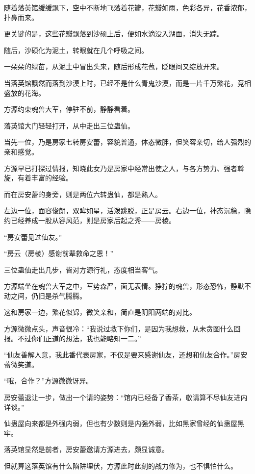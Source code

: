 
\begin{this_body}

随着落英馆缓缓飘下，空中不断地飞落着花瓣，花瓣如雨，色彩各异，花香浓郁，扑鼻而来。

更关键的是，这些花瓣飘落到沙硕上后，便如水滴没入湖面，消失无踪。

随后，沙硕化为泥土，转眼就在几个呼吸之间。

一朵朵的绿苗，从泥土中冒出头来，随后形成花苞，眨眼间又绽放开来。

当落英馆飘然而落到沙漠上时，已经不是什么青鬼沙漠，而是一片千万繁花，竞相盛放的花海。

方源约束魂兽大军，停驻不前，静静看着。

落英馆大门轻轻打开，从中走出三位蛊仙。

当先一位，乃是房家七转房安蕾，容貌普通，体态微胖，但笑容亲切，给人强烈的亲和感觉。

方源早已打探过情报，知晓此女乃是房家中经常出使之人，与各方势力、强者斡旋，有着丰富的经验。

而在房安蕾的身旁，则是两位六转蛊仙，都是熟人。

左边一位，面容俊朗，双眸如星，活泼跳脱，正是房云。右边一位，神态沉稳，隐约已经养成一股从容风范，则是房家后起之秀——房棱。

“房安蕾见过仙友。”

“房云（房棱）感谢前辈救命之恩！”

三位蛊仙走出几步，皆对方源行礼，态度相当客气。

方源端坐在魂兽大军之中，军势森严，面无表情。狰狞的魂兽，形态恐怖，静默不动之间，仍旧是杀气腾腾。

这和房家一边，繁花似锦，微笑亲和，简直是阴阳两端的对比。

方源微微点头，声音很冷：“我说过救下你们，是因为我想救，从未贪图什么回报。不过你们正道的想法，我也能略知一二。”

“仙友善解人意，我此番代表房家，不仅是要来感谢仙友，还想和仙友合作。”房安蕾微笑道。

“哦，合作？”方源微微讶异。

房安蕾退让一步，做出一个请的姿势：“馆内已经备了香茶，敬请算不尽仙友进内详谈。”

仙蛊屋向来都是外强内弱，但也有少数则是内强外弱，比如黑家曾经的仙蛊屋黑牢。

落英馆显然是前者，房安蕾邀请方源进去，颇显诚意。

但就算这落英馆有什么陷阱埋伏，方源此时此刻的战力修为，也不惧怕什么。


\end{this_body}
